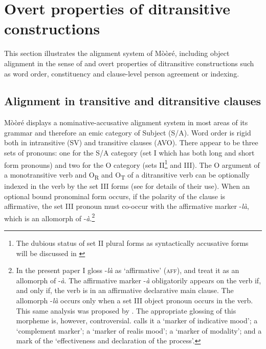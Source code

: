 \documentclass[output=paper]{langsci/langscibook}
\begin{document}
\section{Overt properties of ditransitive constructions}\label{§4:overt.pacchiarotti}

This section illustrates the alignment system of Mòòré, including object alignment in the sense of \citet{malchukovetal2010} and overt properties of ditransitive constructions such as word order, constituency and clause-level person agreement or indexing.

\subsection{Alignment in transitive and ditransitive clauses}\label{§4.1:alignment.pacchiarotti}

Mòòré displays a nominative-accusative alignment system in most areas of its grammar and therefore an emic category of Subject (S/A). Word order is rigid both in intransitive (SV) and transitive clauses (AVO). There appear to be three sets of pronouns: one for the S/A category (set I which has both long and short form pronouns) and two for the O category (sets II\footnote{The dubious status of set II plural forms as syntactically accusative forms will be discussed in \label{§4.3:split.pacchiarotti}} and III). The O argument of a monotransitive verb and O\textsubscript{R} and O\textsubscript{T} of a ditransitive verb can be optionally indexed in the verb by the set III forms (see  for details of their use). When an optional bound pronominal form occurs, if the polarity of the clause is affirmative, the set III pronoun must co-occur with the affirmative marker -\textit{l\`{a}}, which is an allomorph of -\textit{\`{a}}.\footnote{In the present paper I gloss -\textit{l\`{a}} as `affirmative' (\textsc{aff}), and treat it as an allomorph of -\textit{\`{a}}. The affirmative marker -\textit{\`{a}} obligatorily appears on the verb if, and only if, the verb is in an affirmative declarative main clause. The allomorph -\textit{l\`{a}} occurs only when a set III object pronoun occurs in the verb. This same analysis was proposed by \citet{manessy1963}. The appropriate glossing of this morpheme is, however, controversial. \citet[96]{alexandre1953} calls it a `marker of indicative mood'; \citet[112]{peterson1971} a `complement marker'; \citet{canu1976} a `marker of realis mood'; \citet{Kabore1985} a `marker of modality'; and \citet{nikiema2003} a mark of the `effectiveness and declaration of the process'.} 
\end{document}
